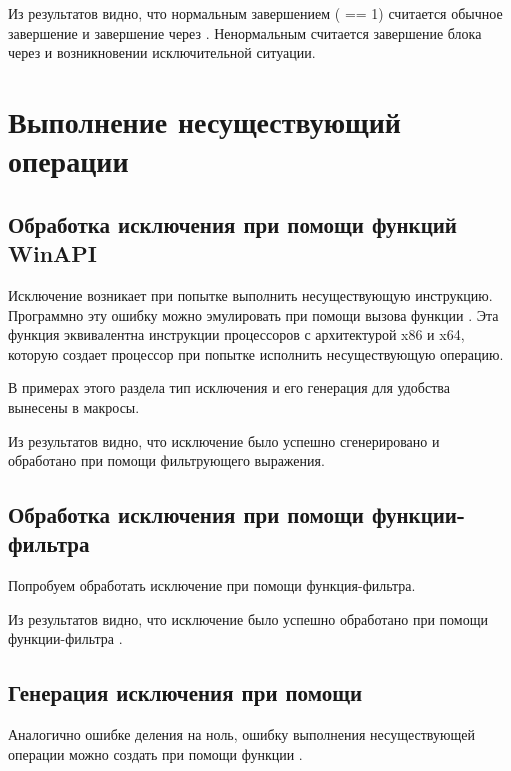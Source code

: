 
Из результатов видно, что нормальным завершением ( == 1) считается обычное завершение и завершение через . Ненормальным считается завершение блока через  и возникновении исключительной ситуации.

\newpage

\section{Выполнение несуществующий операции}

\subsection{Обработка исключения при помощи функций WinAPI}

Исключение  возникает при попытке выполнить несуществующую инструкцию. Программно эту ошибку можно эмулировать при помощи вызова функции . Эта функция эквивалентна инструкции  процессоров с архитектурой x86 и x64, которую создает процессор при попытке исполнить несуществующую операцию.

В примерах этого раздела тип исключения и его генерация для удобства вынесены в макросы.


Из результатов видно, что исключение было успешно сгенерировано и обработано при помощи фильтрующего выражения.

\subsection{Обработка исключения при помощи функции-фильтра}

Попробуем обработать исключение при помощи функция-фильтра.


Из результатов видно, что исключение было успешно обработано при помощи функции-фильтра .

\subsection{Генерация исключения при помощи }

Аналогично ошибке деления на ноль, ошибку выполнения несуществующей операции можно создать при помощи функции .

